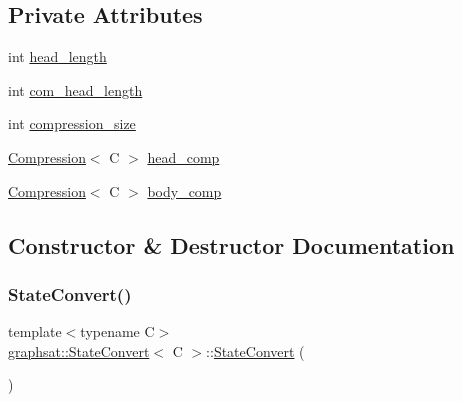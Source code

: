 \subsection*{Private Attributes}
\begin{DoxyCompactItemize}
\item 
int \mbox{\hyperlink{classgraphsat_1_1_state_convert_a1d5bd9e862cf4706b233d19b1f2ec177}{head\+\_\+length}}
\item 
int \mbox{\hyperlink{classgraphsat_1_1_state_convert_acc3d0c1279169cd1aefd98d1108fc760}{com\+\_\+head\+\_\+length}}
\item 
int \mbox{\hyperlink{classgraphsat_1_1_state_convert_a79277c8bb484de1333a5ca54f506875d}{compression\+\_\+size}}
\item 
\mbox{\hyperlink{classgraphsat_1_1_compression}{Compression}}$<$ C $>$ \mbox{\hyperlink{classgraphsat_1_1_state_convert_a95cd073445c5508b92a64d7f506e8ef3}{head\+\_\+comp}}
\item 
\mbox{\hyperlink{classgraphsat_1_1_compression}{Compression}}$<$ C $>$ \mbox{\hyperlink{classgraphsat_1_1_state_convert_a0461d849c4c747460f7f625f2dac2fa4}{body\+\_\+comp}}
\end{DoxyCompactItemize}


\subsection{Constructor \& Destructor Documentation}
\mbox{\label{classgraphsat_1_1_state_convert_aaa56e67d173c8d73eb4925b20e812d68}} 
\subsubsection{\texorpdfstring{StateConvert()}{StateConvert()}\hspace{0.1cm}{\footnotesize\ttfamily [1/2]}}
{\footnotesize\ttfamily template$<$typename C$>$ \\
\mbox{\hyperlink{classgraphsat_1_1_state_convert}{graphsat\+::\+State\+Convert}}$<$ C $>$\+::\mbox{\hyperlink{classgraphsat_1_1_state_convert}{State\+Convert}} (\begin{DoxyParamCaption}{ }\end{DoxyParamCaption})\hspace{0.3cm}{\ttfamily [inline]}}

